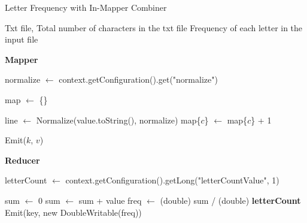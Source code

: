     \begin{algorithm}[H]
    \caption{Letter Frequency with In-Mapper Combiner}
    \begin{algorithmic}[1]
    \Require Txt file, Total number of characters in the txt file
    \Ensure Frequency of each letter in the input file
    
    \vspace{1em}

    \Statex
    \noindent \textbf{Mapper}
        
            \State normalize $\leftarrow$ context.getConfiguration().get("normalize")
        
        \State map $\leftarrow$ \{\}
        
        \EndProcedure

        \vspace{1em}

            \State line $\leftarrow$ Normalize(value.toString(), normalize)
                \State map\{$c$\} $\leftarrow$ map\{$c$\} + 1
            
            \EndFor
        \EndProcedure

        \vspace{1em}

             
                \State Emit($k$, $v$)
            \EndFor
        \EndProcedure
    
        \vspace{1em}

    \Statex
    \noindent \textbf{Reducer}
        
            \State letterCount $\leftarrow$ context.getConfiguration().getLong("letterCountValue", 1)
        \EndProcedure

        \vspace{1em}

            \State sum $\leftarrow$ 0
                \State sum $\leftarrow$ sum + value
            \EndFor
            \State freq $\leftarrow$ (double) sum / (double) \textbf{letterCount}
            \State Emit(key, new DoubleWritable(freq))
        \EndProcedure

    \end{algorithmic}
    \end{algorithm}
    